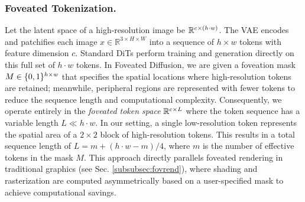 \subsubsection{Foveated Tokenization. }\label{subsubsc:fov_token}
Let the latent space of a high-resolution image be $\mathbb{R}^{c \times (h \cdot w)}$. The VAE encodes and patchifies each image $x\in \mathbb{R}^{3 \times H \times W}$ into a sequence of $h \times w$ tokens with feature dimension $c$. Standard DiTs perform training and generation directly on this full set of $h \cdot w$ tokens. 
In Foveated Diffusion, we are given a foveation mask $M \in \{0,1\}^{h \times w}$ that specifies the spatial locations where high-resolution tokens are retained; meanwhile, peripheral regions are represented with fewer tokens to reduce the sequence length and computational complexity. Consequently, we operate entirely in the \emph{foveated token space} $\mathbb{R}^{c \times L}$ where the token sequence has a variable length $L \ll h \cdot w$. In our setting, a single low-resolution token represents the spatial area of a $2\times 2$ block of high-resolution tokens. This results in a total sequence length of $L = m + (h \cdot w - m) / 4$, where $m$ is the number of effective tokens in the mask $M$.
This approach directly parallels foveated rendering in traditional graphics (see Sec. \ref{subsubsec:fovrend}), where shading and rasterization are computed asymmetrically based on a user-specified mask to achieve computational savings.



